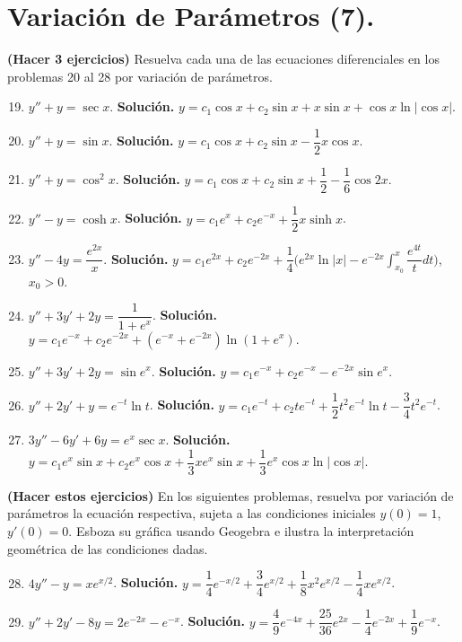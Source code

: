 \documentclass[letterpaper,10pt]{memoir}
\begin{document}
\section*{Variación de Parámetros (7).} %
\textbf{(Hacer 3 ejercicios)} Resuelva cada una de las ecuaciones diferenciales en los problemas 20 al 28 por variación de parámetros.
\begin{enumerate}
	\setcounter{enumi}{18}
\item \(y'' +y= \sec x\).  \textbf{Solución.} \(y=c_1 \cos x+c_2 \sin x +x \sin x+ \cos x \ln \big| \cos x \big|\).
\item \(y'' +y= \sin x\). \textbf{Solución.} \(y=c_1 \cos x+c_2 \sin x- \dfrac{1}{2} x \cos x\).
\item \(y'' +y= \cos ^2x\). \textbf{Solución.} \(y=c_1 \cos x+c_2 \sin x+ \dfrac{1}{2} - \dfrac{1}{ 6} \cos 2x\).
\item \(y'' -y= \cosh x\). \textbf{Solución.} \(y=c_1e^x+c_2e^{-x} + \dfrac{1}{2} x\sinh x\).
\item \(y'' -4y= \dfrac{e^{2x}}{x}\). \textbf{Solución.} \(y=c_1 e^{2x} +c_2e^{-2x} + \dfrac{1}{4} \Bigg(e^{2x} \ln |x|-e^{-2x} \displaystyle\int _{x_0} ^x \dfrac{e^{4t}}{t} dt\Bigg)\), \(x_0>0\).
\item \(y'' +3y' +2y= \dfrac{1}{1+e^x}\). \textbf{Solución.} \(y=c_1e^{-x} +c_2e^{-2x} +(e^{-x} +e^{-2x}) \ln (1+e^x)\).
\item \(y'' +3y' +2y= \sin e^x\). \textbf{Solución.} \(y=c_1e^{-x} +c_2e^{-x} -e^{-2x} \sin e^x\).
\item \(y'' +2y' +y=e^{-t} \ln t\). \textbf{Solución.} \(y=c_1e^{-t} +c_2te^{-t} + \dfrac{1}{2} t^2e^{-t} \ln t- \dfrac{3}{4} t^2e^{-t}\).
\item \(3y'' -6y' +6y=e^x \sec x\). \textbf{Solución.} \(y=c_1e^x \sin x+c_2e^x \cos x+ \dfrac{1}{3} xe^x \sin x+ \dfrac{1}{3} e^x \cos x \ln \big| \cos x \big|\).
\end{enumerate}
\textbf{(Hacer estos ejercicios)} En los siguientes problemas, resuelva por variación de parámetros la ecuación respectiva, sujeta a las condiciones iniciales \(y(0) =1\), \(y' (0) =0\). Esboza su gráfica usando Geogebra e ilustra la interpretación geométrica de las condiciones dadas.
\begin{enumerate}
	\setcounter{enumi}{27}
	\item \(4y'' -y=xe^{x/2}\). \textbf{Solución.} \(y= \dfrac{1}{4} e^{-x/2} + \dfrac{3}{4} e^{x/2} + \dfrac{1}{8} x^2e^{x/2} - \dfrac{1}{4} xe^{x/2}\).
	\item \(y'' +2y' -8y=2e^{-2x} -e^{-x}\). \textbf{Solución.} \(y= \dfrac{4}{9} e^{-4x} + \dfrac{25}{36} e^{2x} - \dfrac{1}{4} e^{-2x} + \dfrac{1}{9} e^{-x}\).
\end{enumerate}
\end{document}
